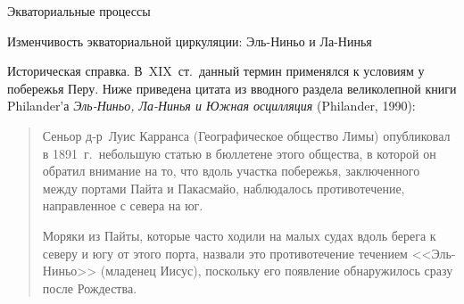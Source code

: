 \begin{chapter}{Экваториальные процессы}
\begin{section}{Изменчивость экваториальной циркуляции: Эль-Ниньо и Ла-Нинья}
\begin{paragraph}{Историческая справка.}
В~XIX~ст.\ данный термин применялся к условиям у побережья Перу. Ниже 
приведена цитата из вводного раздела великолепной книги Philander'а 
\emph{Эль-Ниньо, Ла-Нинья и Южная осцилляция} 
(Philander, 1990):
%
\begin{quotation}
Сеньор д-р~Луис Карранса (Географическое общество Лимы)
опубликовал в 1891~г.\ небольшую статью в бюллетене этого общества, в которой 
он обратил внимание на то, что вдоль участка побережья, заключенного между 
портами Пайта и Пакасмайо, наблюдалось противотечение, направленное с севера
на юг.
%

Моряки из Пайты, которые часто ходили на малых судах вдоль берега к северу
и югу от этого порта, назвали это противотечение течением <<Эль-Ниньо>>
(младенец Иисус), поскольку его появление обнаружилось сразу после 
Рождества.
%


\end{quotation}
\end{paragraph}
\end{section}
\end{chapter}
